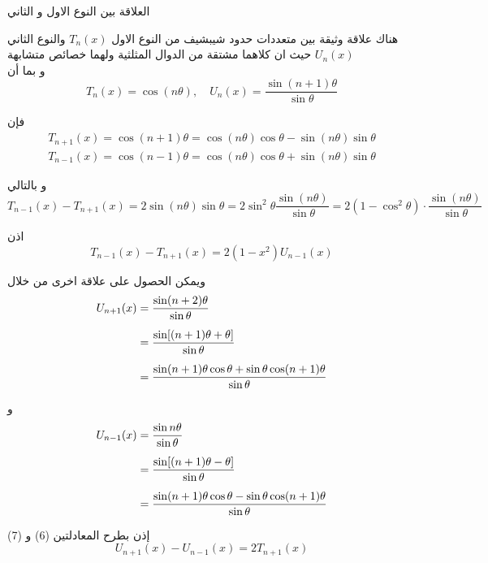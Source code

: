 	\begin{frame}{العلاقة بين النوع الاول و الثاني}

\pause
\noindent
هناك علاقة وثيقة بين متعددات حدود شيبشيف من النوع الاول  $T_n(x)$ والنوع الثاني $U_n(x)$ حيث ان كلاهما مشتقة من الدوال المثلثية ولهما خصائص متشابهة\\

\pause
 و بما أن
 \[
 T_n(x) = \cos(n \theta), \quad U_n(x) = \frac{\sin(n+1)\theta}{\sin\theta}
 \]
 
 \pause
 فإن
 \begin{align}
 	T_{n+1}(x) = \cos(n+1)\theta = \cos(n\theta)\cos\theta - \sin(n\theta)\sin\theta \\
 T_{n-1}(x) = \cos(n-1)\theta = \cos(n\theta)\cos\theta + \sin(n\theta)\sin\theta 
 \end{align}
 
 \pause
 و بالتالي
 \[
 T_{n-1}(x) - T_{n+1}(x) = 2 \sin(n\theta) \sin\theta = 2 \sin^2\theta \frac{\sin(n\theta)}{\sin\theta} = 2(1-\cos^2 \theta)\cdot\frac{\sin(n\theta)}{\sin \theta}
 \]
	\end{frame}
	
\begin{frame}
	
	\pause
		اذن
		\begin{equation}
		T_{n-1}(x) - T_{n+1}(x) = 2 (1-x^2) U_{n-1}(x) 
	\end{equation}
	
	\pause
	ويمكن الحصول على علاقة اخرى من خلال
	\begin{align}
		U_{n+1} (x) &= \frac{\sin(n+2)\theta}{\sin\theta}\notag\\[5pt]
		&= \frac{\sin[(n+1)\theta + \theta]}{\sin \theta}\notag\\[5pt]
		&= \frac{\sin(n+1)\theta\cos\theta + \sin\theta\cos(n+1)\theta}{\sin\theta}
	\end{align}
\end{frame}
\begin{frame} 
	و
	\begin{align}
		U_{n-1} (x) &= \frac{\sin n\theta}{\sin\theta}\notag\\[5pt]
		&= \frac{\sin[(n+1)\theta -\theta]}{\sin \theta}\notag\\[5pt]
		&= \frac{\sin(n+1)\theta\cos\theta - \sin\theta\cos(n+1)\theta}{\sin\theta}
	\end{align}
	
	\pause
	إذن بطرح المعادلتين (6) و (7)
	\begin{equation}
		U_{n+1}(x) - U_{n-1}(x)  = 2T_{n+1}(x)
	\end{equation}
\end{frame}

